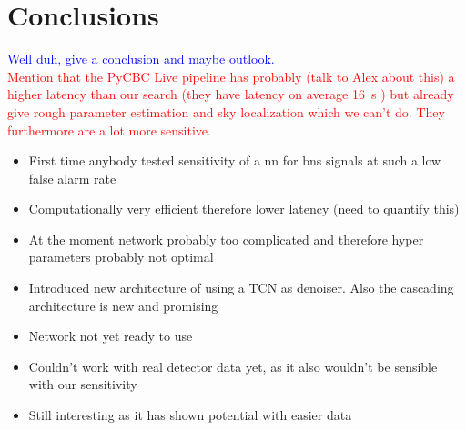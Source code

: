 \section{Conclusions}
\textcolor{blue}{Well duh, give a conclusion and maybe outlook.}\\
\textcolor{red}{Mention that the PyCBC Live pipeline has probably (talk to Alex about this) a higher latency than our search (they have latency on average \SI{16}{\s} \cite{pycbc_live}) but already give rough parameter estimation and sky localization which we can't do. They furthermore are a lot more sensitive.}
\begin{itemize}
	\item First time anybody tested sensitivity of a \gls{nn} for \gls{bns} signals at such a low false alarm rate
	\item Computationally very efficient therefore lower latency (need to quantify this)
	\item At the moment network probably too complicated and therefore hyper parameters probably not optimal
	\item Introduced new architecture of using a TCN as denoiser. Also the cascading architecture is new and promising
	\item Network not yet ready to use
	\item Couldn't work with real detector data yet, as it also wouldn't be sensible with our sensitivity
	\item Still interesting as it has shown potential with easier data
\end{itemize}